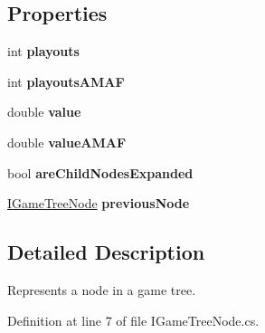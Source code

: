 \subsection*{Properties}
\begin{DoxyCompactItemize}
\item 
\mbox{\label{interface_game_tree_core_1_1_i_game_tree_node_aa2596d50f63fa187625900043521a51b}} 
int {\bfseries playouts}
\item 
\mbox{\label{interface_game_tree_core_1_1_i_game_tree_node_aa45086ef29ac5a68b80d3813c206369b}} 
int {\bfseries playouts\+A\+M\+AF}
\item 
\mbox{\label{interface_game_tree_core_1_1_i_game_tree_node_aaf3626012608f05f2e38b8fbfbf33523}} 
double {\bfseries value}
\item 
\mbox{\label{interface_game_tree_core_1_1_i_game_tree_node_a5c9451b6fd10031ce6a0969f7b42d6b7}} 
double {\bfseries value\+A\+M\+AF}
\item 
\mbox{\label{interface_game_tree_core_1_1_i_game_tree_node_a14c2c88df586e02387ae50edc615b0c6}} 
bool {\bfseries are\+Child\+Nodes\+Expanded}
\item 
\mbox{\label{interface_game_tree_core_1_1_i_game_tree_node_a305c29b932bf087e19f7843c1d14e3af}} 
\mbox{\hyperlink{interface_game_tree_core_1_1_i_game_tree_node}{I\+Game\+Tree\+Node}} {\bfseries previous\+Node}
\end{DoxyCompactItemize}


\subsection{Detailed Description}
Represents a node in a game tree. ~\newline




Definition at line 7 of file I\+Game\+Tree\+Node.\+cs.

